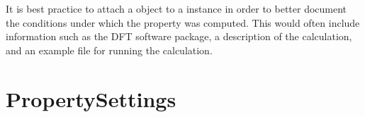 \documentclass[letterpaper,10pt,english]{sphinxmanual}
\begin{document}
\label{\detokenize{property_settings:module-colabfit.tools.property_settings}}
\sphinxAtStartPar
It is best practice to attach a {\hyperref[\detokenize{property_settings:colabfit.tools.property_settings.PropertySettings}]{}} object to a
{\hyperref[\detokenize{property:colabfit.tools.property.Property}]{}} instance in order to better document
the conditions under which the property was computed. This would often include
information such as the DFT software package, a description of the calculation,
and an example file for running the calculation.


\section{PropertySettings}
\label{\detokenize{property_settings:propertysettings}}\label{\detokenize{property_settings::doc}}
\end{document}
